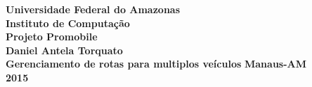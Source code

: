 \thispagestyle{empty}

{\centering
{\sc 
\textbf{
Universidade Federal do Amazonas \\
Instituto de Computação\\
Projeto Promobile\\[4cm]
Daniel Antela Torquato\\[4cm]
Gerenciamento de rotas para multiplos veículos}}
\vfill
{\bf Manaus-AM\\2015\\}
}
